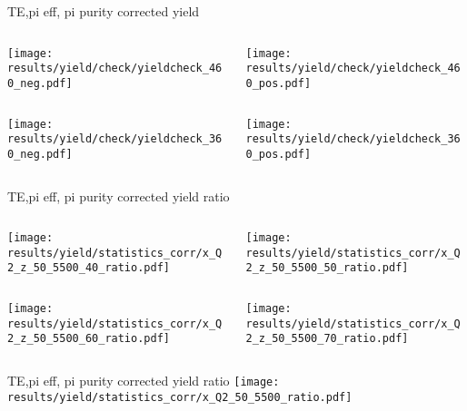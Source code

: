 \begin{frame}{TE,pi eff, pi purity corrected yield}
\begin{columns}
\begin{column}[T]{0.5\textwidth}
\texttt{[image: results/yield/check/yieldcheck\_460\_neg.pdf]}
\end{column}
\begin{column}[T]{0.5\textwidth}
\texttt{[image: results/yield/check/yieldcheck\_460\_pos.pdf]}
\end{column}
\end{columns}
\begin{columns}
\begin{column}[T]{0.5\textwidth}
\texttt{[image: results/yield/check/yieldcheck\_360\_neg.pdf]}
\end{column}
\begin{column}[T]{0.5\textwidth}
\texttt{[image: results/yield/check/yieldcheck\_360\_pos.pdf]}
\end{column}
\end{columns}
\end{frame}
\begin{frame}{TE,pi eff, pi purity corrected yield ratio}
\begin{columns}
\begin{column}[T]{0.5\textwidth}
\texttt{[image: results/yield/statistics\_corr/x\_Q2\_z\_50\_5500\_40\_ratio.pdf]}
\end{column}
\begin{column}[T]{0.5\textwidth}
\texttt{[image: results/yield/statistics\_corr/x\_Q2\_z\_50\_5500\_50\_ratio.pdf]}
\end{column}
\end{columns}
\begin{columns}
\begin{column}[T]{0.5\textwidth}
\texttt{[image: results/yield/statistics\_corr/x\_Q2\_z\_50\_5500\_60\_ratio.pdf]}
\end{column}
\begin{column}[T]{0.5\textwidth}
\texttt{[image: results/yield/statistics\_corr/x\_Q2\_z\_50\_5500\_70\_ratio.pdf]}
\end{column}
\end{columns}
\end{frame}
\begin{frame}{TE,pi eff, pi purity corrected yield ratio}
\texttt{[image: results/yield/statistics\_corr/x\_Q2\_50\_5500\_ratio.pdf]}
\end{frame}

